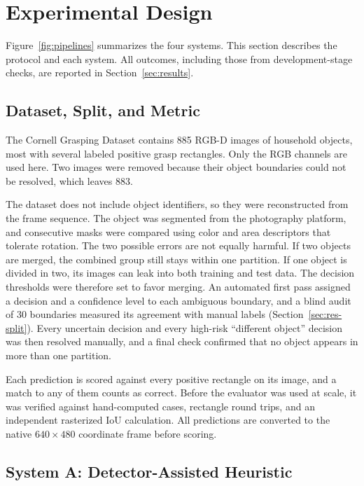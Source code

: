 \documentclass[10pt,conference,compsoc]{IEEEtran}
\begin{document}
\section{Experimental Design}

Figure~\ref{fig:pipelines} summarizes the four systems. This section describes
the protocol and each system. All outcomes, including those from
development-stage checks, are reported in Section~\ref{sec:results}.


\subsection{Dataset, Split, and Metric}

The Cornell Grasping Dataset contains 885 RGB-D images of household objects,
most with several labeled positive grasp rectangles. Only the RGB channels
are used here. Two images were removed because their object boundaries could
not be resolved, which leaves 883.

The dataset does not include object identifiers, so they were reconstructed
from the frame sequence. The object was segmented from the photography
platform, and consecutive masks were compared using color and area
descriptors that tolerate rotation. The two possible errors are not equally
harmful. If two objects are merged, the combined group still stays within one
partition. If one object is divided in two, its images can leak into both
training and test data. The decision thresholds were therefore set to favor
merging. An automated first pass assigned a decision and a confidence level
to each ambiguous boundary, and a blind audit of 30 boundaries measured its
agreement with manual labels (Section~\ref{sec:res-split}). Every uncertain
decision and every high-risk ``different object'' decision was then resolved
manually, and a final check confirmed that no object appears in more than
one partition.

Each prediction is scored against every positive rectangle on its image, and
a match to any of them counts as correct. Before the evaluator was used at
scale, it was verified against hand-computed cases, rectangle round trips,
and an independent rasterized IoU calculation. All predictions are converted
to the native $640\times480$ coordinate frame before scoring.

\subsection{System A: Detector-Assisted Heuristic}
\end{document}
